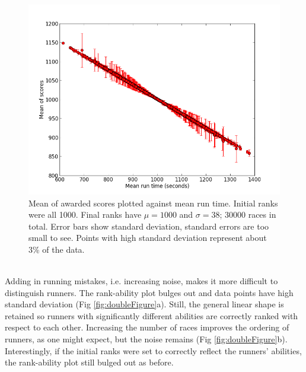 \begin{figure}[h]     
    \begin{center}                        
        \includegraphics[width=15cm]{./images/diffAbilitiesNoErrorConstantInit.png}
	\end{center}
	\caption{Mean of awarded scores plotted against mean run time. Initial ranks were all 1000. Final ranks have $\mu=1000$ and $\sigma=38$; 30000 races in total. Error bars show standard deviation, standard errors are too small to see. Points with high standard deviation represent about 3\% of the data.}
	\label{fig:diffAbilitiesNoErrorConstantInit}
\end{figure}\\
Adding in running mistakes, i.e. increasing noise, makes it more difficult to distinguish runners. The rank-ability plot bulges out and data points have high standard deviation (Fig \ref{fig:doubleFigure}a). Still, the general linear shape is retained so runners with significantly different abilities are correctly ranked with respect to each other. Increasing the number of races improves the ordering of runners, as one might expect, but the noise remains (Fig \ref{fig:doubleFigure}b). Interestingly, if the initial ranks were set to correctly reflect the runners' abilities, the rank-ability plot still bulged out as before.\\

